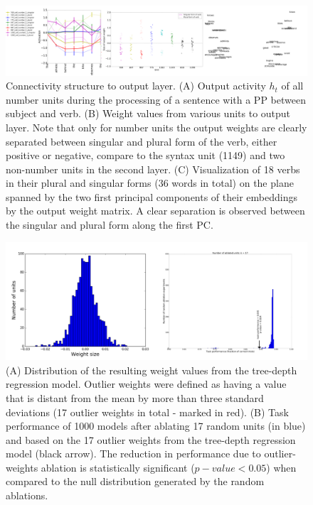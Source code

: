 \begin{figure}[t]
\centering
\includegraphics[width=\textwidth]{Figures/Figure4_output_weights.png}
\caption{Connectivity structure to output layer. (A) Output activity $h_t$ of all number units during the processing of a sentence with a PP between subject and verb. (B) Weight values from various units to output layer. Note that only for number units the output weights are clearly separated between singular and plural form of the verb, either positive or negative, compare to the syntax unit (1149) and two non-number units in the second layer. (C) Visualization of 18 verbs in their plural and singular forms (36 words in total) on the plane spanned by the two first principal components of their embeddings by the output weight matrix. A clear separation is observed between the singular and plural form along the first PC.}
\end{figure}

\begin{figure}[b]
\centering
\includegraphics[width=\linewidth]{Figures/Figure6_regression.png}
\caption{(A) Distribution of the resulting weight values from the tree-depth regression model. Outlier weights were defined as having a value that is distant from the mean by more than three standard deviations (17 outlier weights in total - marked in red). (B) Task performance of 1000 models after ablating 17 random units (in blue) and based on the 17 outlier weights from the tree-depth regression model (black arrow). The reduction in performance due to outlier-weights ablation is statistically significant ($p-value < 0.05$) when compared to the null distribution generated by the random ablations.}
\end{figure}

